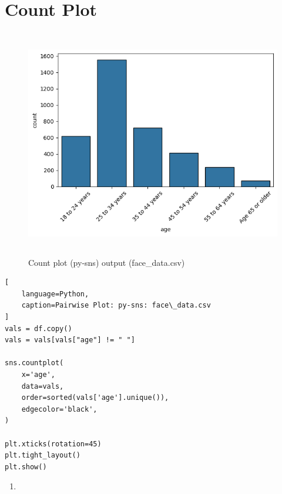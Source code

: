 \section{Count Plot \cite{data/online/seaborn.countplot}} \label{Visualizing Data/Count Plot}


\begin{table}[H]
\begin{minipage}[t]{0.35\linewidth}
\begin{figure}[H]
    \centering
    \includegraphics[width=0.9\linewidth, height=10cm, keepaspectratio]{images/data/__visualizations__/sns-countplot-face-data.png}
    \caption{Count plot (py-sns) output (face\_data.csv)}
\end{figure}
\end{minipage}
\hspace{0.2cm}
\vrule width 1pt
\hspace{0.5cm}
\begin{minipage}[t]{0.57\linewidth}
\begin{lstlisting}[
    language=Python,
    caption=Pairwise Plot: py-sns: face\_data.csv
]
vals = df.copy()
vals = vals[vals["age"] != " "]

sns.countplot(
    x='age', 
    data=vals, 
    order=sorted(vals['age'].unique()), 
    edgecolor='black',
)

plt.xticks(rotation=45)
plt.tight_layout()
plt.show()
\end{lstlisting}
\end{minipage}
\end{table}

\vspace{0.3cm}

\begin{enumerate}
    \item 
\end{enumerate}

